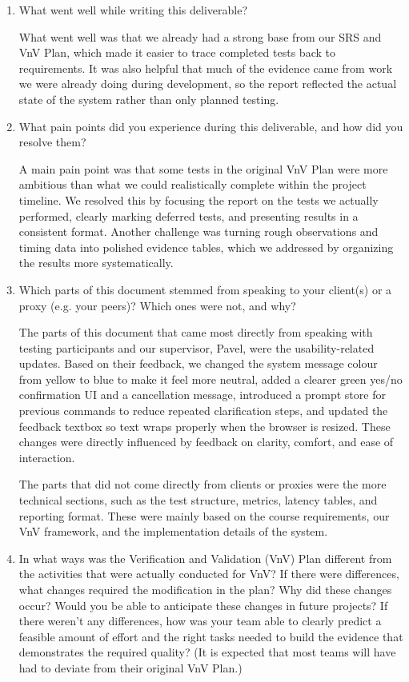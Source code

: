 \documentclass[12pt, titlepage]{article}
\begin{document}
\begin{enumerate}
  \item What went well while writing this deliverable?

  What went well was that we already had a strong base from our SRS and VnV Plan, which made it easier to trace completed tests back to requirements. It was also helpful that much of the evidence came from work we were already doing during development, so the report reflected the actual state of the system rather than only planned testing.

  \item What pain points did you experience during this deliverable, and how did you resolve them?

  A main pain point was that some tests in the original VnV Plan were more ambitious than what we could realistically complete within the project timeline. We resolved this by focusing the report on the tests we actually performed, clearly marking deferred tests, and presenting results in a consistent format. Another challenge was turning rough observations and timing data into polished evidence tables, which we addressed by organizing the results more systematically.

  \item Which parts of this document stemmed from speaking to your client(s) or a proxy (e.g. your peers)? Which ones were not, and why?

  The parts of this document that came most directly from speaking with testing participants and our supervisor, Pavel, were the usability-related updates. Based on their feedback, we changed the system message colour from yellow to blue to make it feel more neutral, added a clearer green yes/no confirmation UI and a cancellation message, introduced a prompt store for previous commands to reduce repeated clarification steps, and updated the feedback textbox so text wraps properly when the browser is resized. These changes were directly influenced by feedback on clarity, comfort, and ease of interaction.

  The parts that did not come directly from clients or proxies were the more technical sections, such as the test structure, metrics, latency tables, and reporting format. These were mainly based on the course requirements, our VnV framework, and the implementation details of the system.

  \item In what ways was the Verification and Validation (VnV) Plan different from the activities that were actually conducted for VnV? If there were differences, what changes required the modification in the plan? Why did these changes occur? Would you be able to anticipate these changes in future projects? If there weren't any differences, how was your team able to clearly predict a feasible amount of effort and the right tasks needed to build the evidence that demonstrates the required quality? (It is expected that most teams will have had to deviate from their original VnV Plan.)


\end{enumerate}
\end{document}
